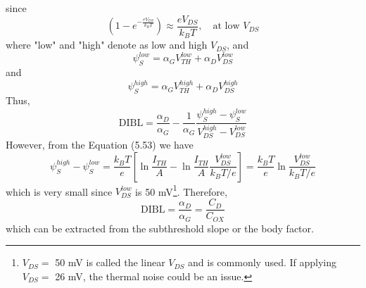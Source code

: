 \begin{equation}
\end{equation} since \begin{equation}
    \left(1-e^{-\frac{eV_{DS}}{k_{B}T}}\right)\approx \frac{eV_{DS}}{k_{B}T},\quad\text{at low $V_{DS}$}\nonumber
\end{equation} where "low" and "high" denote as low and high $V_{DS}$, and \begin{equation}
    \psi_{S}^{low} = \alpha_{G}V_{TH}^{low} + \alpha_{D}V_{DS}^{low}
\end{equation} and \begin{equation}
    \psi_{S}^{high} = \alpha_{G}V_{TH}^{high} + \alpha_{D}V_{DS}^{high}
\end{equation} Thus, \begin{equation}
    \text{DIBL} = \frac{\alpha_{D}}{\alpha_{G}}-\frac{1}{\alpha_{G}}\frac{\psi_{S}^{high}-\psi_{S}^{low}}{V_{DS}^{high}-V_{DS}^{low}}
\end{equation} However, from the Equation (5.53) we have \begin{equation}
    \psi_{S}^{high}-\psi_{S}^{low} = \frac{k_{B}T}{e}\left[\ln{\frac{I_{TH}}{A}}-\ln{\frac{I_{TH}}{A}\frac{V_{DS}^{low}}{k_{B}T/e}}\right] = \frac{k_{B}T}{e}\ln{\frac{V_{DS}^{low}}{k_{B}T/e}}
\end{equation} which is very small since $V_{DS}^{low}$ is 50 mV\footnote{$V_{DS} =$ 50 mV is called the linear $V_{DS}$ and is commonly used. If applying $V_{DS} = $ 26 mV, the thermal noise could be an issue.}. Therefore, \begin{equation}
    \text{DIBL} = \frac{\alpha_{D}}{\alpha_{G}} = \frac{C_{D}}{C_{OX}}
\end{equation} which can be extracted from the subthreshold slope or the body factor.